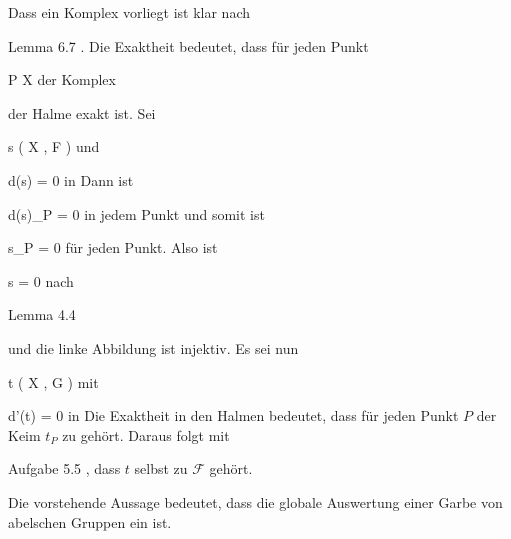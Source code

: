{





Dass ein Komplex vorliegt ist klar nach

Lemma 6.7
.
Die Exaktheit bedeutet, dass für jeden Punkt

\mavergleichskette
{\vergleichskette
{P
}
{ \in }{ X
}
{  }{
}
{    }{
}
{   }{
}
}
{}{}{}
der Komplex

 {  }

der Halme exakt ist. Sei

\mavergleichskette
{\vergleichskette
{s
}
{ \in }{ \Gamma   \left(   X ,  { \mathcal  F   }   \right)
}
{  }{
}
{    }{
}
{   }{
}
}
{}{}{}
und

\mavergleichskette
{\vergleichskette
{ d(s)
}
{ = }{ 0
}
{  }{
}
{    }{
}
{   }{
}
}
{}{}{}
in
 Dann ist

\mavergleichskette
{\vergleichskette
{ d(s)_P
}
{ = }{ 0
}
{  }{
}
{    }{
}
{   }{
}
}
{}{}{}
in jedem Punkt und somit ist

\mavergleichskette
{\vergleichskette
{ s_P
}
{ = }{ 0
}
{  }{
}
{    }{
}
{   }{
}
}
{}{}{}
für jeden Punkt. Also ist

\mavergleichskette
{\vergleichskette
{ s
}
{ = }{ 0
}
{  }{
}
{    }{
}
{   }{
}
}
{}{}{}
nach

Lemma 4.4

und die linke Abbildung ist injektiv. Es sei nun

\mavergleichskette
{\vergleichskette
{ t
}
{ \in }{ \Gamma   \left(   X ,  { \mathcal  G   }   \right)
}
{  }{
}
{    }{
}
{   }{
}
}
{}{}{}
mit

\mavergleichskette
{\vergleichskette
{ d'(t)
}
{ = }{ 0
}
{  }{
}
{    }{
}
{   }{
}
}
{}{}{}
in
 Die Exaktheit in den Halmen bedeutet, dass für jeden Punkt $P$ der Keim $t_P$ zu
 gehört. Daraus folgt mit

Aufgabe 5.5
,
dass $t$ selbst zu ${ \mathcal  F   }$ gehört.




}



Die vorstehende Aussage bedeutet, dass die globale Auswertung einer Garbe von abelschen Gruppen ein
 {} {}
ist.





